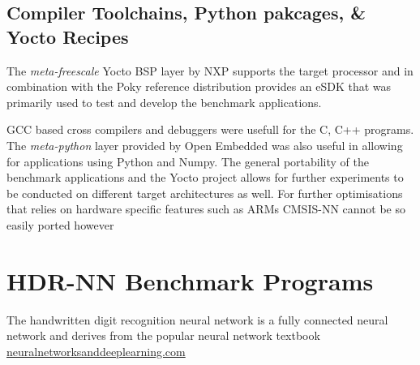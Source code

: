 \subsection{Compiler Toolchains, Python pakcages, \& Yocto Recipes}

The \textit{meta-freescale} Yocto BSP layer by NXP supports the target processor and in combination with the Poky reference distribution provides an eSDK that was primarily used to test and develop the benchmark applications.

GCC based cross compilers and debuggers were usefull for the C, C++ programs. The \textit{meta-python} layer provided by Open Embedded was also useful in allowing for applications using Python and Numpy. The general portability of the benchmark applications and the Yocto project allows for further experiments to be conducted on different target architectures as well. For further optimisations that relies on hardware specific features such as ARM\textquotesingle s CMSIS-NN cannot be so easily ported however

\section[Handwritten Digit Recognition (HDR)]{HDR-NN Benchmark Programs}

The handwritten digit recognition neural network is a fully connected neural network and derives from the popular neural network textbook \href{http://neuralnetworksanddeeplearning.com}{neuralnetworksanddeeplearning.com}

